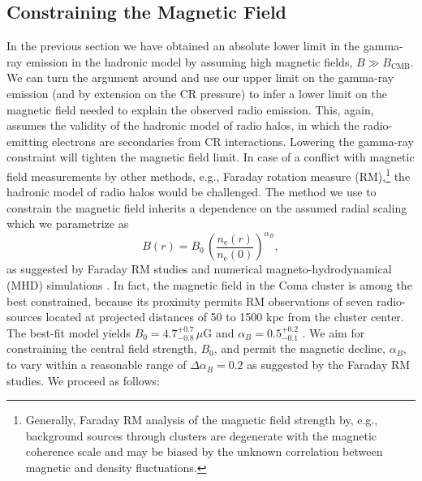\documentclass[12pt,manuscript]{aastex}
\newcommand{\rmn}{\mathrm}
\begin{document}
\subsection{Constraining the Magnetic Field}
\label{sec:B}
In the previous section we have obtained an absolute lower limit in the gamma-ray emission in
the hadronic model by assuming high magnetic fields, $B\gg B_\rmn{CMB}$. We can turn the
argument around and use our upper limit on the gamma-ray emission (and by extension on the
CR pressure) to infer a lower limit on the magnetic field needed to explain the observed radio
emission. This, again, assumes the validity of the hadronic model of radio halos, in which the
radio-emitting electrons are secondaries from CR interactions. Lowering the gamma-ray
constraint will tighten the magnetic field limit. In case of a conflict with magnetic field
measurements by other methods, e.g., Faraday rotation measure (RM),\footnote{Generally,
Faraday RM analysis of the magnetic field strength by, e.g., background sources through
clusters are degenerate with the magnetic coherence scale and may be biased by the unknown
correlation between magnetic and density fluctuations.} the hadronic model of radio halos would
be challenged. The method we use to constrain the magnetic field inherits a dependence on
the assumed radial scaling which we parametrize as
\begin{equation}
\label{eq:B}
B(r) = B_{0} \,\left(\frac{n_{\rmn{e}}(r)}{n_{\rmn{e}}(0)}\right)^{\alpha_B},
\end{equation}
as suggested by Faraday RM studies and numerical magneto-hydrodynamical (MHD) simulations
\citep[][and references therein]{article:Bonafede_etal:2010, article:Bonafede_etal:2011}. In fact,
the magnetic field in the Coma cluster is among the best constrained, because its proximity permits
RM observations of seven radio-sources located at projected distances of 50 to 1500 kpc from the
cluster center. The best-fit model yields $B_{0} = 4.7^{+0.7}_{-0.8}\,\mu$G and
$\alpha_{B} = 0.5^{+0.2}_{-0.1}$ \citep{article:Bonafede_etal:2010}. We aim for constraining the
central field strength, $B_{0}$, and permit the magnetic decline, $\alpha_{B}$, to vary
within a reasonable range of $\Delta\alpha_{B}=0.2$ as suggested by the Faraday RM studies.
We proceed as follows:
\end{document}
